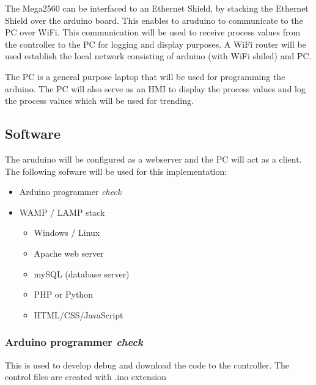 \documentclass[a4paper,oneside]{article}
\begin{document}
The Mega2560 can be interfaced to an Ethernet Shield, by stacking the
Ethernet Shield over the arduino board. This enables to aruduino to
communicate to the PC over WiFi. This communication will be used to
receive process values from the controller to the PC for logging and
display purposes.  A WiFi router will be used establish the local
network consisting of arduino (with WiFi shiled) and PC.

The PC is a general purpose laptop that will be used for programming
the arduino. The PC will also serve as an HMI to display the process
values and log the process values which will be used for trending.

\subsection{Software}
\label{sec:org72a3899}
The aruduino will be configured as a webserver and the PC will act as
a client. The following sofware will be used for this implementation:
\begin{itemize}
\item Arduino programmer \emph{\emph{check}}
\item WAMP / LAMP stack
\begin{itemize}
\item Windows / Linux
\item Apache web server
\item mySQL (database server)
\item PHP or Python
\item HTML/CSS/JavaScript
\end{itemize}
\end{itemize}

\subsubsection{Arduino programmer \emph{\emph{check}}}
\label{sec:orgf5800af}
This is used to develop debug and download the code to the
controller. The control files are created with .ino extension
\end{document}
